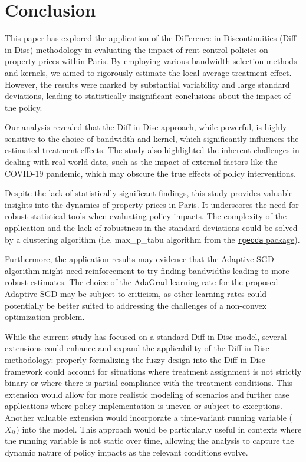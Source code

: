 \documentclass[12pt]{article}
\theoremstyle{plain}
\theoremstyle{remark}
\def\code#1{\texttt{#1}}
\begin{document}
\newpage
\section{Conclusion}
This paper has explored the application of the Difference-in-Discontinuities (Diff-in-Disc) methodology in evaluating the impact of rent control policies on property prices within Paris. By employing various bandwidth selection methods and kernels, we aimed to rigorously estimate the local average treatment effect. However, the results were marked by substantial variability and large standard deviations, leading to statistically insignificant conclusions about the impact of the policy. 

Our analysis revealed that the Diff-in-Disc approach, while powerful, is highly sensitive to the choice of bandwidth and kernel, which significantly influences the estimated treatment effects. The study also highlighted the inherent challenges in dealing with real-world data, such as the impact of external factors like the COVID-19 pandemic, which may obscure the true effects of policy interventions.

Despite the lack of statistically significant findings, this study provides valuable insights into the dynamics of property prices in Paris. It underscores the need for robust statistical tools when evaluating policy impacts. The complexity of the application and the lack of robustness in the standard deviations could be solved by a clustering algorithm (i.e. max\_p\_tabu algorithm from the \href{https://geodacenter.github.io/rgeoda/reference/maxp_tabu.html}{\code{rgeoda} package}). 

Furthermore, the application results may evidence that the Adaptive SGD algorithm might need reinforcement to try finding bandwidths leading to more robust estimates. The choice of the AdaGrad learning rate for the proposed Adaptive SGD may be subject to criticism, as other learning rates could potentially be better suited to addressing the challenges of a non-convex optimization problem.

While the current study has focused on a standard Diff-in-Disc model, several extensions could enhance and expand the applicability of the Diff-in-Disc methodology: properly formalizing the fuzzy design into the Diff-in-Disc framework could account for situations where treatment assignment is not strictly binary or where there is partial compliance with the treatment conditions. This extension would allow for more realistic modeling of scenarios and further case applications where policy implementation is uneven or subject to exceptions. Another valuable extension would incorporate a time-variant running variable ($X_{it}$) into the model. This approach would be particularly useful in contexts where the running variable is not static over time, allowing the analysis to capture the dynamic nature of policy impacts as the relevant conditions evolve.
\end{document}
